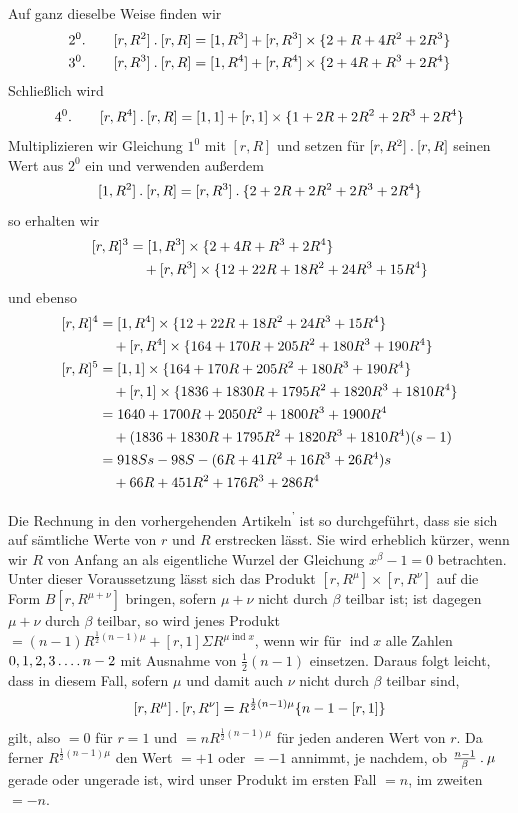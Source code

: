Auf ganz dieselbe Weise finden wir
\[
\begin{aligned}
2^0.\qquad[r,R^2]\mathbin{.}[r,R]&=[1,R^3]+[r,R^3]\times\{2+R+4R^2+2R^3\}\\
3^0.\qquad[r,R^3]\mathbin{.}[r,R]&=[1,R^4]+[r,R^4]\times\{2+4R+R^3+2R^4\}
\end{aligned}
\]
Schließlich wird
\[
4^0.\qquad[r,R^4]\mathbin{.}[r,R]=[1,1]+[r,1]\times\{1+2R+2R^2+2R^3+2R^4\}
\]
Multiplizieren wir Gleichung $1^0$ mit $[r,R]$ und setzen für $[r,R^2]\mathbin{.}[r,R]$ seinen Wert aus $2^0$ ein und verwenden außerdem
\[
[1,R^2]\mathbin{.}[r,R]=[r,R^3]\mathbin{.}\{2+2R+2R^2+2R^3+2R^4\}
\]
so erhalten wir
\[
\begin{aligned}
\relax[r,R]^3&=[1,R^3]\times\{2+4R+R^3+2R^4\}\\
&\quad+[r,R^3]\times\{12+22R+18R^2+24R^3+15R^4\}
\end{aligned}
\]
und ebenso
\[
\begin{aligned}
\relax[r,R]^4&=[1,R^4]\times\{12+22R+18R^2+24R^3+15R^4\}\\
&\quad+[r,R^4]\times\{164+170R+205R^2+180R^3+190R^4\}\\
\relax[r,R]^5&=[1,1]\times\{164+170R+205R^2+180R^3+190R^4\}\\
&\quad+[r,1]\times\{1836+1830R+1795R^2+1820R^3+1810R^4\}\\
&=1640+1700R+2050R^2+1800R^3+1900R^4\\
&\quad+(1836+1830R+1795R^2+1820R^3+1810R^4)(s-1)\\
&=918Ss-98S-(6R+41R^2+16R^3+26R^4)s\\
&\quad+66R+451R^2+176R^3+286R^4
\end{aligned}
\]

Die Rechnung in den vorhergehenden Artikeln\textsuperscript{'} ist so durchgeführt, dass sie sich auf sämtliche Werte von $r$ und $R$ erstrecken lässt. Sie wird erheblich kürzer, wenn wir $R$ von Anfang an als eigentliche Wurzel der Gleichung $x^\beta-1=0$ betrachten. Unter dieser Voraussetzung lässt sich das Produkt $[r,R^\mu]\times[r,R^\nu]$ auf die Form $B[r,R^{\mu+\nu}]$ bringen, sofern $\mu+\nu$ nicht durch $\beta$ teilbar ist; ist dagegen $\mu+\nu$ durch $\beta$ teilbar, so wird jenes Produkt $=(n-1)R^{\frac12(n-1)\mu}+[r,1]\Sigma R^{\mu\operatorname{ind}x}$, wenn wir für $\operatorname{ind}x$ alle Zahlen $0,1,2,3\mathinner{.\,.\,.\,.} n-2$ mit Ausnahme von $\frac12(n-1)$ einsetzen. Daraus folgt leicht, dass in diesem Fall, sofern $\mu$ und damit auch $\nu$ nicht durch $\beta$ teilbar sind,
\[
[r,R^\mu]\mathbin{.}[r,R^\nu]=R^{\frac12(n-1)\mu}\{n-1-[r,1]\}
\]
gilt, also $=0$ für $r=1$ und $=nR^{\frac12(n-1)\mu}$ für jeden anderen Wert von $r$. Da ferner $R^{\frac12(n-1)\mu}$ den Wert $=+1$ oder $=-1$ annimmt, je nachdem, ob $\frac{n-1}\beta\mathbin{.}\mu$ gerade oder ungerade ist, wird unser Produkt im ersten Fall $=n$, im zweiten $=-n$.

